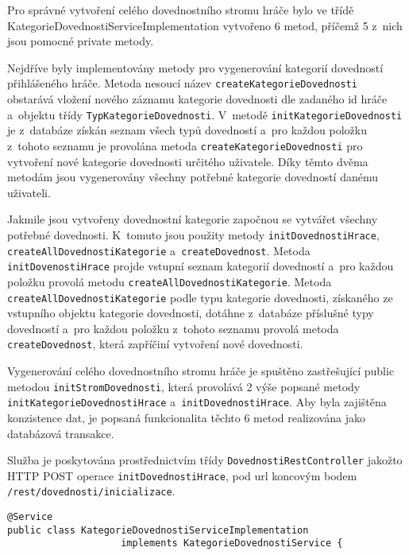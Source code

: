 \documentclass[twoside, 12pt]{article}
\begin{document}
{\clearpage

\obrazek
{}

Pro správné vytvoření celého dovednostního stromu hráče bylo ve třídě KategorieDovednostiServiceImplementation vytvořeno 6 metod,
příčemž 5 z~nich jsou pomocné private metody.

Nejdříve byly implementovány metody pro vygenerování kategorií dovedností přihlášeného hráče.
Metoda nesoucí název \texttt{createKategorieDovednosti} obstarává vložení nového záznamu kategorie dovednosti dle zadaného id hráče a~objektu třídy
\texttt{TypKategorieDovednosti}.
V~metodě \texttt{initKategorieDovednosti} je z~databáze získán seznam všech typů dovedností
a~pro každou položku z~tohoto seznamu je provolána metoda \texttt{createKategorieDovednosti} pro vytvoření nové kategorie dovednosti určitého uživatele.
Díky těmto dvěma metodám jsou vygenerovány všechny potřebné kategorie dovedností danému uživateli.

Jakmile jsou vytvořeny dovednostní kategorie započnou se vytvářet všechny potřebné dovednosti.
K~tomuto jsou použity metody \texttt{initDovednostiHrace}, \texttt{createAllDovednostiKategorie} a~\texttt{createDovednost}.
Metoda \texttt{initDovenostiHrace} projde vstupní seznam kategorií dovedností
a~pro každou položku provolá metodu \texttt{createAllDovednostiKategorie}.
Metoda \texttt{createAllDovednostiKategorie}  podle typu kategorie dovednosti,
získaného ze vstupního objektu kategorie dovednosti,
dotáhne z~databáze příslušné typy dovedností a~pro každou položku z~tohoto seznamu provolá metoda \texttt{createDovednost},
která zapříčiní vytvoření nové dovednosti.

Vygenerování celého dovednostního stromu hráče je spuštěno zastřešující public metodou \texttt{initStromDovednosti},
která provolává 2 výše popsané metody \texttt{initKategorieDovednostiHrace} a~\texttt{initDovednostiHrace}.
Aby byla zajištěna konzistence dat, je popsaná funkcionalita těchto 6 metod realizována jako databázová transakce.

Služba je poskytována prostřednictvím třídy \texttt{DovednostiRestController} jakožto HTTP POST operace \texttt{initDovednostiHrace},
pod url koncovým bodem \texttt{/rest/dovednosti/inicializace}.

\begin{lstlisting}
@Service
public class KategorieDovednostiServiceImplementation
                    implements KategorieDovednostiService {


\end{lstlisting}}
\end{document}
